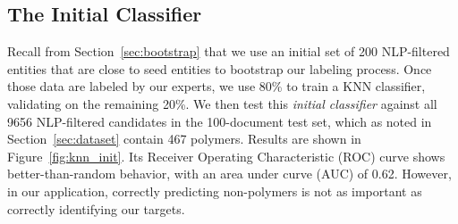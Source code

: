 \subsection{The Initial Classifier}
Recall from Section~\ref{sec:bootstrap} that we use an initial set of 200 NLP-filtered entities that are close
to seed entities to bootstrap our labeling process.
Once those data are labeled by our experts, 
we use 80\% to train a KNN classifier, validating on the remaining 20\%. 
We then test this \textit{initial classifier} against all \num{9656} NLP-filtered candidates in the 100-document test set,
which as noted in Section~\ref{sec:dataset} contain \num{467} polymers.
Results are shown in Figure~\ref{fig:knn_init}.
Its Receiver Operating Characteristic (ROC) curve
shows better-than-random behavior, with an area under curve (AUC) of 0.62. 
However, in our application, correctly predicting non-polymers is not as important as correctly identifying our targets.
